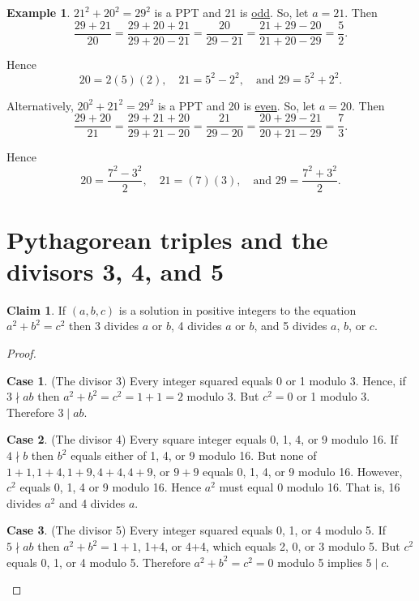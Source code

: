 \documentclass{article}
\theoremstyle{definition}
\newtheorem{claim}{Claim}
\newtheorem{example}{Example}[section]
\newtheorem{case}{Case}[section]
\begin{document}
\begin{example}
\( 21^2 + 20^2 = 29^2 \) is a PPT and 21 is \underline{odd}. So, let \(a = 21\). Then \[ \frac{29+21}{20} = \frac{29+20+21}{29+20-21} = \frac{20}{29-21} = \frac{21+29-20}{21+20-29} = \frac{5}{2}. \]

Hence \[ 20=2(5)(2), \quad 21=5^2-2^2, \quad \text{and }
29=5^2+2^2. \]

\noindent Alternatively, \(20^2 + 21^2 = 29^2\) is a PPT and 20 is \underline{even}. So, let \(a = 20\). Then \[ \frac{29+20}{21} = \frac{29+21+20}{29+21-20} = \frac{21}{29-20} = \frac{20+29-21}{20+21-29} = \frac{7}{3}. \]

Hence \[ 20 = \frac{7^2-3^2}{2}, \quad 21=(7)(3), \quad \text{and } 29 = \frac{7^2+3^2}{2}. \]
\end{example}

\section{Pythagorean triples and the divisors 3, 4, and 5}

\begin{claim}
If \((a,b,c)\) is a solution in positive integers to the equation  \(a^2+b^2 = c^2\) then 3 divides \(a\) or \(b\), 4 divides \(a\) or \(b\), and 5 divides \(a\), \(b\), or \(c\).
\end{claim}

\begin{proof}
\begin{case} (The divisor 3) Every integer squared equals 0 or 1 modulo 3. Hence, if \(3\nmid ab\) then \(a^2+b^2 = c^2 = 1+1 = 2\) modulo 3. But \(c^2= 0\) or 1 modulo 3. Therefore \(3 \mid ab\).
\end{case}
\begin{case} (The divisor 4) Every square integer equals 0, 1, 4, or 9 modulo 16. If \(4\nmid b\) then \(b^2\) equals either of 1, 4, or 9 modulo 16. But none of  \(1+1, 1+4, 1+9, 4+4, 4+9\), or \(9+9\) equals 0, 1, 4, or 9 modulo 16. However, \(c^2\) equals 0, 1, 4 or 9 modulo 16. Hence \(a^2\) must equal 0 modulo 16. That is, 16 divides \(a^2\) and 4 divides \(a\).
\end{case}
\begin{case} (The divisor 5) Every integer squared equals 0, 1, or 4 modulo 5. If \(5\nmid ab\) then \(a^2 + b^2 = 1+1\), 1+4, or 4+4, which equals 2, 0, or 3 modulo 5. But \(c^2\) equals 0, 1, or 4 modulo 5. Therefore  \(a^2 + b^2 = c^2 = 0\) modulo 5 implies \( 5\mid c \).
\end{case}
\end{proof}
\end{document}
